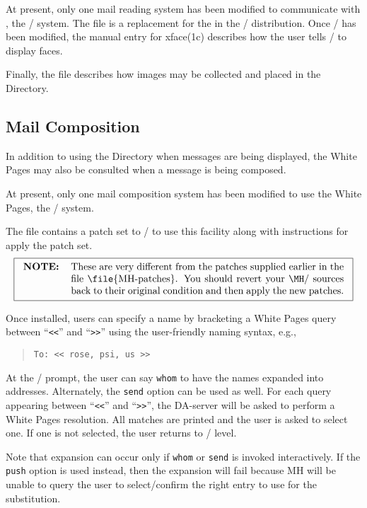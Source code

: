 At present,
only one mail reading system has been modified to communicate with
,
the \MH/ system.
The file  is a replacement for the
 in the \MH/ distribution.
Once \MH/ has been modified,
the manual entry for \man xface(1c) describes how the user tells \MH/ to
display faces.

Finally,
the file  describes how images may be collected and
placed in the Directory.

\subsection	{Mail Composition}
In addition to using the Directory when messages are being displayed, 
the White Pages may also be consulted when a message is being composed.

At present,
only one mail composition system has been modified to use the White Pages,
the \MH/ system.

The file  contains a patch set to \MH/
to use this facility along with instructions for apply the patch set.
\[\fbox{\begin{tabular}{lp{0.8\textwidth}}
\bf NOTE:&	These are very different from the patches supplied earlier
		in the file \file{MH-patches}.
		You should revert your \MH/ sources back to their
		original condition and then apply the new patches.
\end{tabular}}\]

Once installed,
users can specify a name by bracketing a White Pages query between
``\verb"<<"'' and ``\verb">>"'' using the user-friendly naming syntax,
e.g.,
\begin{quote}\small\begin{verbatim}
To: << rose, psi, us >>
\end{verbatim}\end{quote}
At the \whatnow/ prompt,
the user can say \verb"whom" to have the names expanded into addresses.
Alternately, the \verb"send" option can be used as well.
For each query appearing between ``\verb"<<"'' and ``\verb">>"'',
the DA-server will be asked to perform a White Pages resolution.
All matches are printed and the user is asked to select one.
If one is not selected,
the user returns to \whatnow/ level.

Note that expansion can occur only if \verb"whom" or \verb"send" is invoked
interactively. 
If the \verb"push" option is used instead,
then the expansion will fail because MH will be unable to query 
the user to select/confirm the right entry to use for the substitution.

